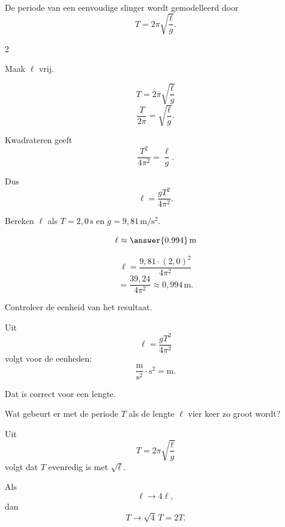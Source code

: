 \documentclass{ximera}
\begin{document}

\begin{oefening}{\oefU\ESS}
\\

De periode van een eenvoudige slinger wordt gemodelleerd door
\[
T=2\pi\sqrt{\frac{\ell}{g}}.
\]

\begin{multicols}{2}

\begin{question}
Maak $\ell$ vrij.

\begin{oplossing}
\[
T=2\pi\sqrt{\frac{\ell}{g}}
\]
\[
\frac{T}{2\pi}
=\sqrt{\frac{\ell}{g}}.
\]

Kwadrateren geeft
\[
\frac{T^2}{4\pi^2}
=\frac{\ell}{g}.
\]

Dus
\[
\ell=\frac{gT^2}{4\pi^2}.
\]
\end{oplossing}
\end{question}


\begin{question}
Bereken $\ell$ als $T=2{,}0\,\mathrm s$ en
$g=9{,}81\,\mathrm{m/s^2}$.

\[
\ell\approx\answer{0.994}\,\mathrm m
\]

\begin{oplossing}
\[
\ell
=\frac{9{,}81\cdot(2{,}0)^2}{4\pi^2}
\]
\[
=\frac{39{,}24}{4\pi^2}
\approx0{,}994\,\mathrm m.
\]
\end{oplossing}
\end{question}


\begin{question}
Controleer de eenheid van het resultaat.

\begin{oplossing}
Uit
\[
\ell=\frac{gT^2}{4\pi^2}
\]
volgt voor de eenheden:
\[
\frac{\mathrm m}{\mathrm s^2}
\cdot\mathrm s^2
=\mathrm m.
\]

Dat is correct voor een lengte.
\end{oplossing}
\end{question}


\begin{question}
Wat gebeurt er met de periode $T$ als de lengte $\ell$ vier keer zo groot wordt?

\begin{oplossing}
Uit
\[
T=2\pi\sqrt{\frac{\ell}{g}}
\]
volgt dat $T$ evenredig is met $\sqrt{\ell}$.

Als
\[
\ell\to4\ell,
\]
dan
\[
T\to\sqrt4\,T=2T.
\]


\end{oplossing}
\end{question}
\end{multicols}
\end{oefening}
\end{document}
